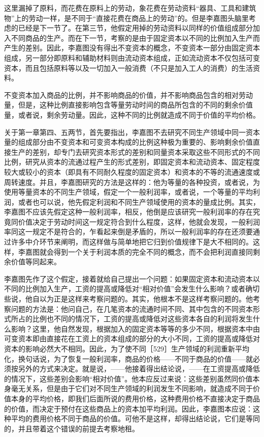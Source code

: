 这里漏掉了原料，而花费在原料上的劳动，象花费在劳动资料“器具、工具和建筑物”上的劳动一样，是不同于“直接花费在商品上的劳动”的。但是李嘉图头脑里考虑的已经是下一节了。在第三节，他假定用掉的劳动资料以同样的价值组成部分加入不同商品的生产。而在下一节，考察的是由于固定资本以不同的比例加入生产而产生的差别。因此，李嘉图没有得出不变资本的概念，不变资本一部分由固定资本组成，另一部分即原料和辅助材料则由流动资本组成，正如流动资本不仅包括可变资本，而且包括原料等以及一切加入一般消费（不只是加入工人的消费）的生活资料。

不变资本加入商品的比例，并不影响商品的价值，并不影响商品包含的相对劳动量，但是，这种比例直接影响包含等量劳动时间的商品所包含的不同的剩余价值量，或者说，剩余劳动量。因此，这种不同的比例就造成不同于价值的平均价格。

关于第一章第四、五两节，首先要指出，李嘉图不去研究不同生产领域中同一资本量的组成部分由不变资本和可变资本构成的比例这种极为重要的、影响剩余价值直接生产的差别，却专门去研究资本形式的差别和同量资本采取这些不同形式的不同比例，研究从资本的流通过程产生的形式差别，即固定资本和流动资本、固定程度较大或较小的资本（即具有不同耐久程度的固定资本）和资本的不等的流通速度或周转速度。并且，李嘉图研究的方法是这样的：他为等量的各种投资，或者说，为使用等量资本的不同生产领域，假定一个一般利润率，或者说，一个等量的平均利润，或者也可以说，他先假定利润和不同生产领域使用的资本的量成比例。其实，李嘉图不应该先假定这种一般利润率，相反，他倒是应该研究一般利润率的存在究竟同价值决定于劳动时间这一规定符合到什么程度，这样，他就会发现，一般利润率同这一规定不是符合的，乍看起来倒是矛盾的，所以一般利润率的存在还须要通过许多中介环节来阐明，而这样做与简单地把它归到价值规律下是大不相同的。这样，李嘉图就会得到一个关于利润本质的完全不同的概念，而不会把利润直接同剩余价值等同起来。

李嘉图先作了这个假定，接着就给自己提出一个问题：如果固定资本和流动资本以不同的比例加入生产，工资的提高或降低对“相对价值”会发生什么影响？或者确切些说，他自以为正是这样来考察问题的。其实，他根本不是这样考察问题的。他考察问题的方法是：他问自己，在几笔资本的流通时间不同、其中包含的不同资本形式所占的比例也不同的情况下，工资的提高或降低对这些资本各自的利润将发生什么影响？这里，他自然发现，根据加入的固定资本等等的多少不同，根据资本中由可变资本即由直接花在工资上的资本组成的部分的大小不同，工资的提高或降低对资本的影响必然大不相同。因此，为了使不同［529］生产领域的利润重新平均化，换句话说，为了恢复一般利润率，商品的价格——不同于商品的价值——就必须按另外的方式来决定。就是说，——他接着得出结论说，——在工资提高或降低的情况下，这些差别会影响“相对价值”。他本应反过来说：这些差别虽然同价值本身毫无关系，但是由于它们对不同生产领域的利润发生不同影响，就造成不同于价值本身的平均价格，即我们后面所说的费用价格，这种费用价格不直接决定于商品的价值，而决定于预付在这些商品上的资本加平均利润。因此，李嘉图本应说：这种平均的费用价格不同于商品的价值。可他不是这样，却得出结论说，它们是等同的，并且带着这个错误的前提去考察地租。

